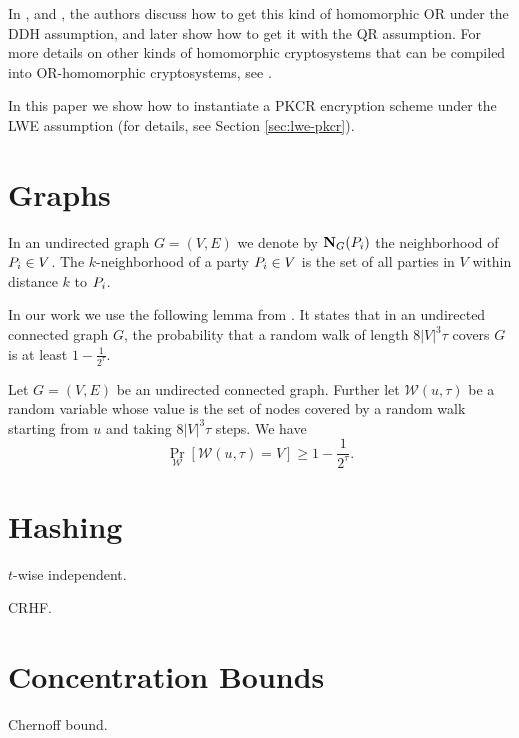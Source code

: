 In \cite{C:HMTZ16}, \cite{EC:AkaMor17} and \cite{C:AkaLaVMor17}, the authors discuss how to get this kind of homomorphic OR under the DDH assumption, and later \cite{EPRINT:AkaLaVMor17} show how to get it with the QR assumption. For more details on other kinds of homomorphic cryptosystems that can be compiled into OR-homomorphic cryptosystems, see \cite{EPRINT:AkaLaVMor17}.

In this paper we show how to instantiate a PKCR encryption scheme under the LWE assumption (for details, see Section \ref{sec:lwe-pkcr}).


\section{Graphs}
In an undirected graph $G = (V,E)$ we denote by $\mathbf{N}_G(P_i)$ the neighborhood of $P_i \in V$. The $k$-neighborhood of a party $P_i \in V$ is the set of all parties in $V$ within distance $k$ to $P_i$.

In our work we use the following lemma from \cite{C:AkaLaVMor17}. It states that in an undirected connected graph $G$, the probability that a random walk of length $8|V|^3 \tau$ covers $G$ is at least $1- \frac{1}{2^\tau}$. 

\begin{lemma}\label{lem:randomWalkCover}
	Let $G = (V,E)$ be an undirected connected graph. Further let $\mathcal{W}(u,\tau)$ be a random variable whose value is the set of nodes covered by a random walk starting from $u$ and taking $8|V|^3 \tau$  steps. We have
	\begin{equation*}
	\Pr_\mathcal{W}[\mathcal{W}(u,\tau) = V] \ge 1- \frac{1}{2^\tau}.
	\end{equation*} 
\end{lemma}

\section{Hashing}
$t$-wise independent.

CRHF.

\section{Concentration Bounds}
Chernoff bound.

